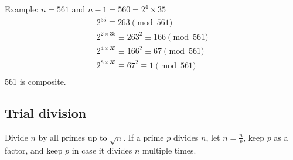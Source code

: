 \documentclass{article}
\begin{document}
Example:
$n = 561$ and $n - 1 = 560 = 2^4 \times 35$
\begin{align*}
    2^{35} \equiv 263 \pmod{561} \\
    2^{2 \times 35} \equiv 263^2 \equiv 166 \pmod{561} \\
    2^{4 \times 35} \equiv 166^2 \equiv 67 \pmod{561} \\
    2^{8 \times 35} \equiv 67^2 \equiv 1 \pmod{561} \\
\end{align*}
561 is composite.

\subsection*{Trial division}
Divide $n$ by all primes up to $\sqrt{n}$. If a prime $p$ divides $n$, let $n = \frac{n}{p}$, keep $p$ as a factor, and keep $p$ in case it divides $n$ multiple times.
\end{document}
